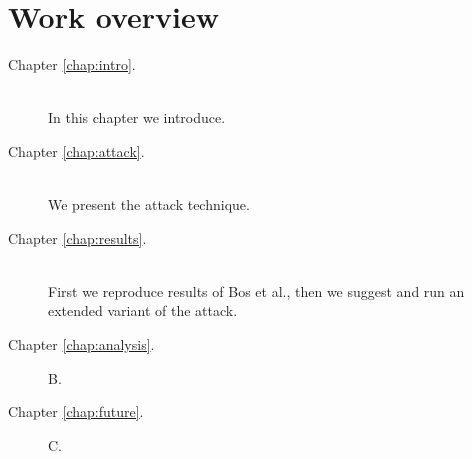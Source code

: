 



\section*{Work overview}
	\begin{description}
		\item[Chapter \ref{chap:intro}.] ~ \\
			In this chapter we introduce.
		\item[Chapter \ref{chap:attack}.] ~ \\
			We present the attack technique.
		\item[Chapter \ref{chap:results}.] ~ \\
			First we reproduce results of Bos et al., then we suggest and run an extended variant of the attack.
		\item[Chapter \ref{chap:analysis}.] B.
		\item[Chapter \ref{chap:future}.] C.
	\end{description}
